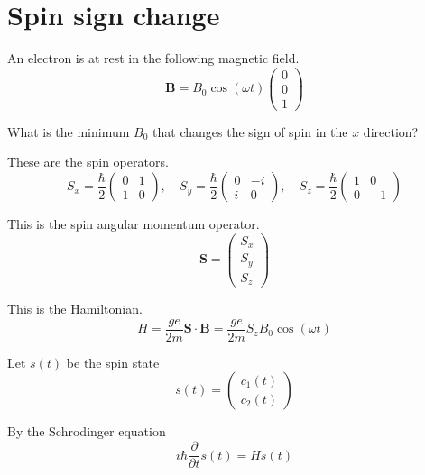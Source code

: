 

\section*{Spin sign change}

An electron is at rest in the following magnetic field.
\begin{equation*}
\mathbf B=B_0\cos(\omega t)\begin{pmatrix}0\\0\\1\end{pmatrix}
\end{equation*}

What is the minimum $B_0$ that changes the sign of spin in the $x$ direction?

\bigskip
These are the spin operators.
\begin{equation*}
S_x=\frac{\hbar}{2}\begin{pmatrix}0&1\\1&0\end{pmatrix},\quad
S_y=\frac{\hbar}{2}\begin{pmatrix}0&-i\\i&0\end{pmatrix},\quad
S_z=\frac{\hbar}{2}\begin{pmatrix}1&0\\0&-1\end{pmatrix}
\end{equation*}

This is the spin angular momentum operator.
\begin{equation*}
\mathbf S=\begin{pmatrix}S_x\\S_y\\S_z\end{pmatrix}
\end{equation*}

This is the Hamiltonian.
\begin{equation*}
H=\frac{ge}{2m}\mathbf S\cdot\mathbf B
=\frac{ge}{2m}S_zB_0\cos(\omega t)
\end{equation*}

Let $s(t)$ be the spin state
\begin{equation*}
s(t)=\begin{pmatrix}c_1(t)\\c_2(t)\end{pmatrix}
\end{equation*}

By the Schrodinger equation
\begin{equation*}
i\hbar\frac{\partial}{\partial t}s(t)=Hs(t)
\end{equation*}

